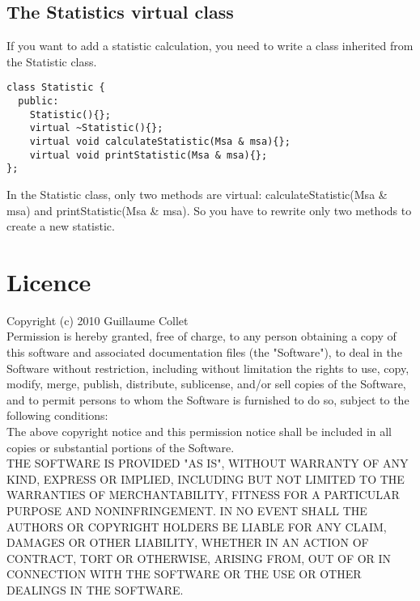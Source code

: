\documentclass[12pt]{report}
\begin{document}
\subsection{The Statistics virtual class}
\label{cla_sec}
If you want to add a statistic calculation, you need to write a class inherited from the Statistic class.
\begin{verbatim}
class Statistic {
  public:
    Statistic(){};
    virtual ~Statistic(){};
    virtual void calculateStatistic(Msa & msa){};
    virtual void printStatistic(Msa & msa){};
};
\end{verbatim}
In the Statistic class, only two methods are virtual: calculateStatistic(Msa \& msa) and printStatistic(Msa \& msa).
So you have to rewrite only two methods to create a new statistic.




\newpage
\section*{Licence}
Copyright (c) 2010 Guillaume Collet\\

Permission is hereby granted, free of charge, to any person obtaining a copy
of this software and associated documentation files (the "Software"), to deal
in the Software without restriction, including without limitation the rights
to use, copy, modify, merge, publish, distribute, sublicense, and/or sell
copies of the Software, and to permit persons to whom the Software is
furnished to do so, subject to the following conditions:\\

The above copyright notice and this permission notice shall be included in
all copies or substantial portions of the Software. \\

THE SOFTWARE IS PROVIDED "AS IS", WITHOUT WARRANTY OF ANY KIND, EXPRESS OR
IMPLIED, INCLUDING BUT NOT LIMITED TO THE WARRANTIES OF MERCHANTABILITY,
FITNESS FOR A PARTICULAR PURPOSE AND NONINFRINGEMENT. IN NO EVENT SHALL THE
AUTHORS OR COPYRIGHT HOLDERS BE LIABLE FOR ANY CLAIM, DAMAGES OR OTHER
LIABILITY, WHETHER IN AN ACTION OF CONTRACT, TORT OR OTHERWISE, ARISING FROM,
OUT OF OR IN CONNECTION WITH THE SOFTWARE OR THE USE OR OTHER DEALINGS IN
THE SOFTWARE.
\end{document}
